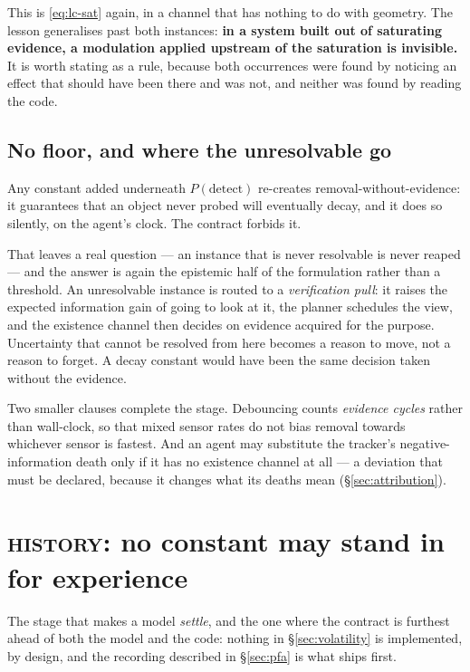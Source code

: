 \documentclass[11pt,a4paper]{report}
\newcommand{\stage}[1]{\textsc{#1}}
\newcommand{\History}{\stage{history}}
\begin{document}
This is \eqref{eq:lc-sat} again, in a channel that has nothing to do with geometry. The lesson
generalises past both instances: \textbf{in a system built out of saturating evidence, a modulation
applied upstream of the saturation is invisible.} It is worth stating as a rule, because both
occurrences were found by noticing an effect that should have been there and was not, and neither was
found by reading the code.

\subsection{No floor, and where the unresolvable go}

Any constant added underneath $P(\text{detect})$ re-creates removal-without-evidence: it guarantees
that an object never probed will eventually decay, and it does so silently, on the agent's clock. The
contract forbids it.

That leaves a real question --- an instance that is never resolvable is never reaped --- and the
answer is again the epistemic half of the formulation rather than a threshold. An unresolvable
instance is routed to a \emph{verification pull}: it raises the expected information gain of going to
look at it, the planner schedules the view, and the existence channel then decides on evidence
acquired for the purpose. Uncertainty that cannot be resolved from here becomes a reason to move,
not a reason to forget. A decay constant would have been the same decision taken without the
evidence.

Two smaller clauses complete the stage. Debouncing counts \emph{evidence cycles} rather than
wall-clock, so that mixed sensor rates do not bias removal towards whichever sensor is fastest. And
an agent may substitute the tracker's negative-information death only if it has no existence channel
at all --- a deviation that must be declared, because it changes what its deaths mean
(\S\ref{sec:attribution}).

\section{\History: no constant may stand in for experience}
\label{sec:history}

The stage that makes a model \emph{settle}, and the one where the contract is furthest ahead of both
the model and the code: nothing in \S\ref{sec:volatility} is implemented, by design, and the
recording described in \S\ref{sec:pfa} is what ships first.
\end{document}
